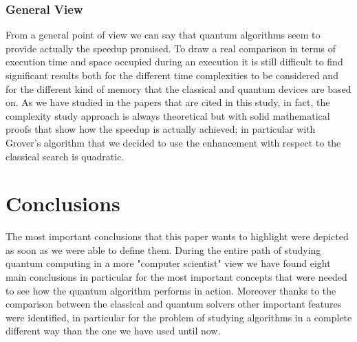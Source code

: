 \documentclass[english]{article}
\begin{document}
			\subsubsection{General View}
			\label{sec:generalViewComparison}
				From a general point of view we can say that quantum algorithms seem to provide actually the speedup promised. To draw a real comparison in terms of execution time and space occupied during an execution it is still difficult to find significant results both for the different time complexities to be considered and for the different kind of memory that the classical and quantum devices are based on. As we have studied in the papers that are cited in this study, in fact, the complexity study approach is always theoretical but with solid mathematical proofs that show how the speedup is actually achieved; in particular with Grover's algorithm that we decided to use the enhancement with respect to the classical search is quadratic. 
			
	\section{Conclusions}
	\label{sec:conclusions}
		The most important conclusions that this paper wants to highlight were depicted as soon as we were able to define them. During the entire path of studying quantum computing in a more "computer scientist" view we have found eight main conclusions in particular for the most important concepts that were needed to see how the quantum algorithm performs in action. Moreover thanks to the comparison between the classical and quantum solvers other important features were identified, in particular for the problem of studying algorithms in a complete different way than the one we have used until now. \\
		
\end{document}
